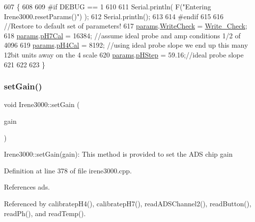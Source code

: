 \begin{DoxyCode}
607 \{
608 
609 \textcolor{preprocessor}{#if DEBUG == 1 }
610 
611     Serial.println( F(\textcolor{stringliteral}{"Entering Irene3000.resetParams()"}) );
612     Serial.println();
613 
614 \textcolor{preprocessor}{#endif }
615 
616     \textcolor{comment}{//Restore to default set of parameters!}
617     \hyperlink{classIrene3000_a136585a5ee7f9ac6ab52175fa153f8e3}{params}.\hyperlink{structIrene3000_1_1parameters__T_a56f1f14d33a69300d580eda2dc52cecd}{WriteCheck} = \hyperlink{Irene3000_8h_a9fa3b8fd890fde289060ee254cd273d5}{Write\_Check};
618     \hyperlink{classIrene3000_a136585a5ee7f9ac6ab52175fa153f8e3}{params}.\hyperlink{structIrene3000_1_1parameters__T_a21265466a570d84bff914f26d2f7a03e}{pH7Cal} = 16384; \textcolor{comment}{//assume ideal probe and amp conditions 1/2 of 4096}
619     \hyperlink{classIrene3000_a136585a5ee7f9ac6ab52175fa153f8e3}{params}.\hyperlink{structIrene3000_1_1parameters__T_a1144de6fb54eb3e1dd2a3d8c2afc97dc}{pH4Cal} = 8192; \textcolor{comment}{//using ideal probe slope we end up this many 12bit units away on the
       4 scale}
620     \hyperlink{classIrene3000_a136585a5ee7f9ac6ab52175fa153f8e3}{params}.\hyperlink{structIrene3000_1_1parameters__T_a61cfcc2539d5f630e9071f3753aba9fe}{pHStep} = 59.16;\textcolor{comment}{//ideal probe slope}
621 
622 
623 \}
\end{DoxyCode}
\mbox{\label{classIrene3000_aff7c5da186b388e7272e63ff88a20c34}} 
\subsubsection{\texorpdfstring{set\+Gain()}{setGain()}}
{\footnotesize\ttfamily void Irene3000\+::set\+Gain (\begin{DoxyParamCaption}\item[{ads\+Gain\+\_\+t}]{gain }\end{DoxyParamCaption})}

Irene3000\+::set\+Gain(gain)\+: This method is provided to set the A\+DS chip gain 

Definition at line 378 of file irene3000.\+cpp.



References ads.



Referenced by calibratep\+H4(), calibratep\+H7(), read\+A\+D\+S\+Channel2(), read\+Button(), read\+Ph(), and read\+Temp().


